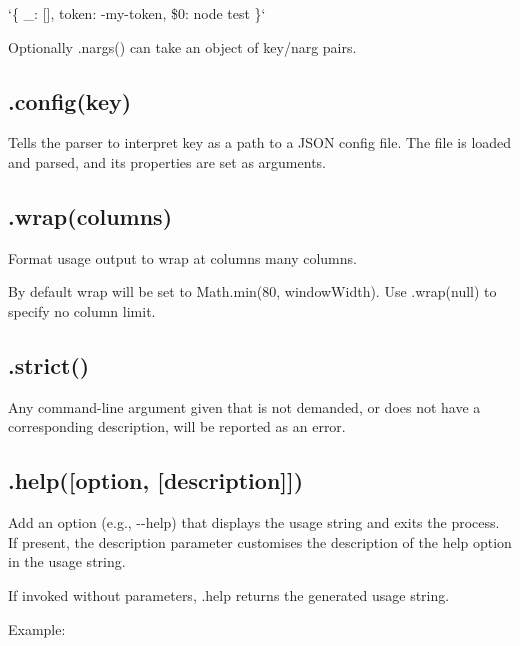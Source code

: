 `\{ \+\_\+\+: \mbox{[}\mbox{]}, token\+: \textquotesingle{}-\/my-\/token\textquotesingle{}, \textquotesingle{}\$0\textquotesingle{}\+: \textquotesingle{}node test\textquotesingle{} \}`

Optionally {\ttfamily .nargs()} can take an object of {\ttfamily key}/{\ttfamily narg} pairs.

\subsection*{.config(key) }

Tells the parser to interpret {\ttfamily key} as a path to a J\+S\+O\+N config file. The file is loaded and parsed, and its properties are set as arguments.

\subsection*{.wrap(columns) }

Format usage output to wrap at {\ttfamily columns} many columns.

By default wrap will be set to {\ttfamily Math.\+min(80, window\+Width)}. Use {\ttfamily .wrap(null)} to specify no column limit.

\subsection*{.strict() }

Any command-\/line argument given that is not demanded, or does not have a corresponding description, will be reported as an error.

\subsection*{.help(\mbox{[}option, \mbox{[}description\mbox{]}\mbox{]}) }

Add an option (e.\+g., {\ttfamily -\/-\/help}) that displays the usage string and exits the process. If present, the {\ttfamily description} parameter customises the description of the help option in the usage string.

If invoked without parameters, {\ttfamily .help} returns the generated usage string.

Example\+:




